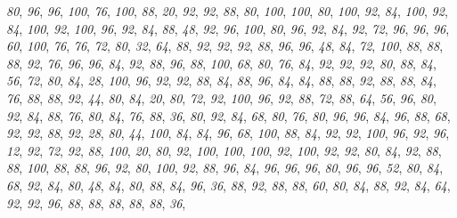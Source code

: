 \documentclass[
]{article}
\begin{document}
\emph{80}, \emph{96}, \emph{96}, \emph{100}, \emph{76}, \emph{100},
\emph{88}, \emph{20}, \emph{92}, \emph{92}, \emph{88}, \emph{80},
\emph{100}, \emph{100}, \emph{80}, \emph{100}, \emph{92}, \emph{84},
\emph{100}, \emph{92}, \emph{84}, \emph{100}, \emph{92}, \emph{100},
\emph{96}, \emph{92}, \emph{84}, \emph{88}, \emph{48}, \emph{92},
\emph{96}, \emph{100}, \emph{80}, \emph{96}, \emph{92}, \emph{84},
\emph{92}, \emph{72}, \emph{96}, \emph{96}, \emph{96}, \emph{60},
\emph{100}, \emph{76}, \emph{76}, \emph{72}, \emph{80}, \emph{32},
\emph{64}, \emph{88}, \emph{92}, \emph{92}, \emph{92}, \emph{88},
\emph{96}, \emph{96}, \emph{48}, \emph{84}, \emph{72}, \emph{100},
\emph{88}, \emph{88}, \emph{88}, \emph{92}, \emph{76}, \emph{96},
\emph{96}, \emph{84}, \emph{92}, \emph{88}, \emph{96}, \emph{88},
\emph{100}, \emph{68}, \emph{80}, \emph{76}, \emph{84}, \emph{92},
\emph{92}, \emph{92}, \emph{80}, \emph{88}, \emph{84}, \emph{56},
\emph{72}, \emph{80}, \emph{84}, \emph{28}, \emph{100}, \emph{96},
\emph{92}, \emph{92}, \emph{88}, \emph{84}, \emph{88}, \emph{96},
\emph{84}, \emph{84}, \emph{88}, \emph{88}, \emph{92}, \emph{88},
\emph{88}, \emph{84}, \emph{76}, \emph{88}, \emph{88}, \emph{92},
\emph{44}, \emph{80}, \emph{84}, \emph{20}, \emph{80}, \emph{72},
\emph{92}, \emph{100}, \emph{96}, \emph{92}, \emph{88}, \emph{72},
\emph{88}, \emph{64}, \emph{56}, \emph{96}, \emph{80}, \emph{92},
\emph{84}, \emph{88}, \emph{76}, \emph{80}, \emph{84}, \emph{76},
\emph{88}, \emph{36}, \emph{80}, \emph{92}, \emph{84}, \emph{68},
\emph{80}, \emph{76}, \emph{80}, \emph{96}, \emph{96}, \emph{84},
\emph{96}, \emph{88}, \emph{68}, \emph{92}, \emph{92}, \emph{88},
\emph{92}, \emph{28}, \emph{80}, \emph{44}, \emph{100}, \emph{84},
\emph{84}, \emph{96}, \emph{68}, \emph{100}, \emph{88}, \emph{84},
\emph{92}, \emph{92}, \emph{100}, \emph{96}, \emph{92}, \emph{96},
\emph{12}, \emph{92}, \emph{72}, \emph{92}, \emph{88}, \emph{100},
\emph{20}, \emph{80}, \emph{92}, \emph{100}, \emph{100}, \emph{100},
\emph{92}, \emph{100}, \emph{92}, \emph{92}, \emph{80}, \emph{84},
\emph{92}, \emph{88}, \emph{88}, \emph{100}, \emph{88}, \emph{88},
\emph{96}, \emph{92}, \emph{80}, \emph{100}, \emph{92}, \emph{88},
\emph{96}, \emph{84}, \emph{96}, \emph{96}, \emph{96}, \emph{80},
\emph{96}, \emph{96}, \emph{52}, \emph{80}, \emph{84}, \emph{68},
\emph{92}, \emph{84}, \emph{80}, \emph{48}, \emph{84}, \emph{80},
\emph{88}, \emph{84}, \emph{96}, \emph{36}, \emph{88}, \emph{92},
\emph{88}, \emph{88}, \emph{60}, \emph{80}, \emph{84}, \emph{88},
\emph{92}, \emph{84}, \emph{64}, \emph{92}, \emph{92}, \emph{96},
\emph{88}, \emph{88}, \emph{88}, \emph{88}, \emph{88}, \emph{36},
\end{document}
